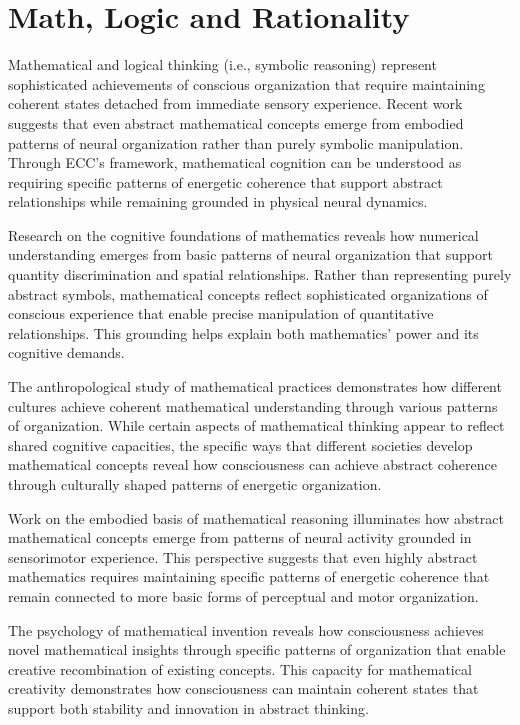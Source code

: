 \section{Math, Logic and Rationality}

Mathematical and logical thinking (i.e., symbolic reasoning) represent sophisticated achievements of conscious organization that require maintaining coherent states detached from immediate sensory experience. Recent work \cite{Lakoff2000} suggests that even abstract mathematical concepts emerge from embodied patterns of neural organization rather than purely symbolic manipulation. Through ECC's framework, mathematical cognition can be understood as requiring specific patterns of energetic coherence that support abstract relationships while remaining grounded in physical neural dynamics.

Research on the cognitive foundations of mathematics \cite{Dehaene2011b} reveals how numerical understanding emerges from basic patterns of neural organization that support quantity discrimination and spatial relationships. Rather than representing purely abstract symbols, mathematical concepts reflect sophisticated organizations of conscious experience that enable precise manipulation of quantitative relationships. This grounding helps explain both mathematics' power and its cognitive demands.

The anthropological study of mathematical practices \cite{Ascher1991} demonstrates how different cultures achieve coherent mathematical understanding through various patterns of organization. While certain aspects of mathematical thinking appear to reflect shared cognitive capacities, the specific ways that different societies develop mathematical concepts reveal how consciousness can achieve abstract coherence through culturally shaped patterns of energetic organization.

Work on the embodied basis of mathematical reasoning \cite{Lakoff2000} illuminates how abstract mathematical concepts emerge from patterns of neural activity grounded in sensorimotor experience. This perspective suggests that even highly abstract mathematics requires maintaining specific patterns of energetic coherence that remain connected to more basic forms of perceptual and motor organization.

The psychology of mathematical invention \cite{Hadamard1945} reveals how consciousness achieves novel mathematical insights through specific patterns of organization that enable creative recombination of existing concepts. This capacity for mathematical creativity demonstrates how consciousness can maintain coherent states that support both stability and innovation in abstract thinking.

